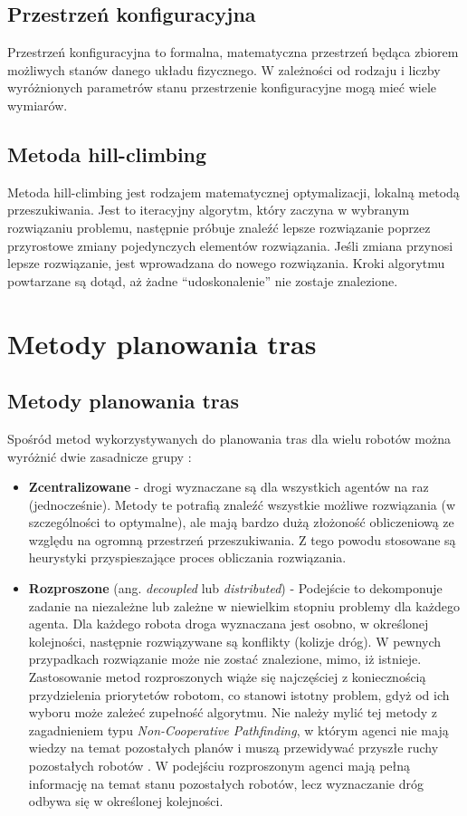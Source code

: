 \section{Przestrzeń konfiguracyjna}
Przestrzeń konfiguracyjna to formalna, matematyczna przestrzeń będąca zbiorem możliwych stanów danego układu fizycznego.
W zależności od rodzaju i liczby wyróżnionych parametrów stanu przestrzenie konfiguracyjne mogą mieć wiele wymiarów.

\section{Metoda hill-climbing}
Metoda hill-climbing jest rodzajem matematycznej optymalizacji, lokalną metodą przeszukiwania.
Jest to iteracyjny algorytm, który zaczyna w wybranym rozwiązaniu problemu, następnie próbuje znaleźć lepsze rozwiązanie poprzez przyrostowe zmiany pojedynczych elementów rozwiązania.
Jeśli zmiana przynosi lepsze rozwiązanie, jest wprowadzana do nowego rozwiązania.
Kroki algorytmu powtarzane są dotąd, aż żadne ``udoskonalenie'' nie zostaje znalezione.

\chapter{Metody planowania tras}
\label{ch:path_planning_methods}

\section{Metody planowania tras}
Spośród metod wykorzystywanych do planowania tras dla wielu robotów można wyróżnić dwie zasadnicze grupy \cite{latombe}:
\begin{itemize}
	\item {\bf Zcentralizowane} - drogi wyznaczane są dla wszystkich agentów na raz (jednocześnie). Metody te potrafią znaleźć wszystkie możliwe rozwiązania (w szczególności to optymalne), ale mają bardzo dużą złożoność obliczeniową ze względu na ogromną przestrzeń przeszukiwania. Z tego powodu stosowane są heurystyki przyspieszające proces obliczania rozwiązania.
	\item {\bf Rozproszone} (ang. {\it decoupled} lub {\it distributed}) - Podejście to dekomponuje zadanie na niezależne lub zależne w niewielkim stopniu problemy dla każdego agenta. Dla każdego robota droga wyznaczana jest osobno, w określonej kolejności, następnie rozwiązywane są konflikty (kolizje dróg). W pewnych przypadkach rozwiązanie może nie zostać znalezione, mimo, iż istnieje. Zastosowanie metod rozproszonych wiąże się najczęściej z koniecznością przydzielenia priorytetów robotom, co stanowi istotny problem, gdyż od ich wyboru może zależeć zupełność algorytmu. Nie należy mylić tej metody z zagadnieniem typu {\it Non-Cooperative Pathfinding}, w którym agenci nie mają wiedzy na temat pozostałych planów i muszą przewidywać przyszłe ruchy pozostałych robotów \cite{cooppath}. W podejściu rozproszonym agenci mają pełną informację na temat stanu pozostałych robotów, lecz wyznaczanie dróg odbywa się w określonej kolejności.
\end{itemize}

